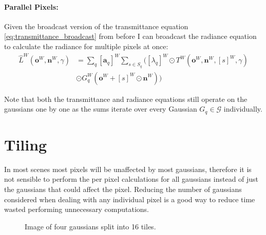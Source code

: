 \documentclass[a4paper, 11pt]{memoir}
\begin{document}
    \paragraph{Parallel Pixels:}
    \label{par:parallel_pixels}
    Given the broadcast version of the \gls{transmittance} equation \eqref{eq:transmittance_broadcast} from before I can broadcast the \gls{radiance} equation to
    calculate the \gls{radiance} for multiple pixels at once:
    \begin{equation}
        \begin{aligned}
            \hat{L}^W(\mathbf{o}^W, \mathbf{n}^W, \gamma) &= \sum_q [ \mathbf{a}_q ]^W \sum_{s \in S_q} \Big(
            [ \lambda_q ]^W \odot T^W(\mathbf{o}^W, \mathbf{n}^W, [ s ]^W, \gamma)\\
            &\odot G_q^W(\mathbf{o}^W + [ s ]^W \odot \mathbf{n}^W) \Big)
        \end{aligned}
        \label{eq:radiance_parallel_pixels}
    \end{equation}

    Note that both the \gls{transmittance} and \gls{radiance} equations still operate on the gaussians one by one as the
    sums iterate over every Gaussian $G_q \in \mathcal{G}$ individually.

    \section{Tiling}
    \label{sec:tiling}
    In most scenes most pixels will be unaffected by most gaussians, therefore it is not sensible to perform
    the per pixel calculations for all gaussians instead of just the gaussians that could affect the pixel.
    Reducing the number of gaussians considered when dealing with any individual pixel is a good way to reduce
    time wasted performing unnecessary computations.

    \begin{figure}[H]
        \centering
        \caption{Image of four gaussians split into 16 tiles.}
        \label{fig:tiling}
    \end{figure}
\end{document}
